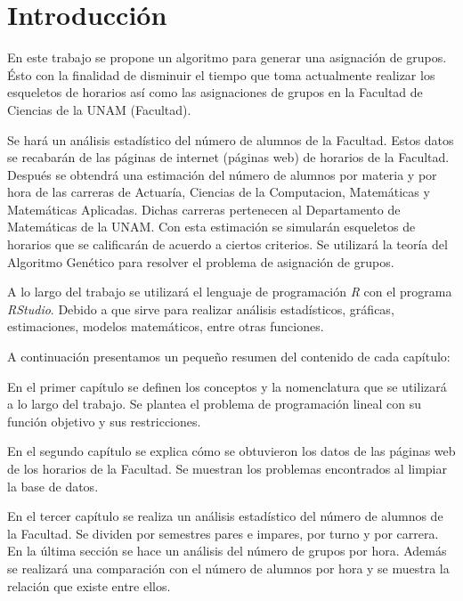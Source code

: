 \chapter*{Introducción}


En este trabajo se propone un algoritmo para generar una asignación de grupos. Ésto con la finalidad de disminuir el tiempo que toma actualmente realizar los esqueletos de horarios así como las asignaciones de grupos en la Facultad de Ciencias de la UNAM (Facultad). 

Se hará un análisis estadístico del número de alumnos de la Facultad. Estos datos se recabarán de las páginas de internet (páginas web) de horarios de la Facultad. Después se obtendrá una estimación del número de alumnos por materia y por hora de las carreras de Actuaría, Ciencias de la Computacion, Matemáticas y Matemáticas Aplicadas. Dichas carreras pertenecen al Departamento de Matemáticas de la UNAM. Con esta estimación se simularán esqueletos de horarios que se calificarán de acuerdo a ciertos criterios. Se utilizará la teoría del Algoritmo Genético para resolver el problema de asignación de grupos. 

A lo largo del trabajo se utilizará el lenguaje de programación \textit{R} con el programa \textit{RStudio}. Debido a que sirve para realizar análisis estadísticos, gráficas, estimaciones, modelos matemáticos, entre otras funciones.

A continuación presentamos un pequeño resumen del contenido de cada capítulo:

En el primer capítulo se definen los conceptos y la nomenclatura que se utilizará a lo largo del trabajo. Se plantea el problema de programación lineal con su función objetivo y sus restricciones.

En el segundo capítulo se explica cómo se obtuvieron los datos de las páginas web de los horarios de la Facultad. Se muestran los problemas encontrados al limpiar la base de datos.

En el tercer capítulo se realiza un análisis estadístico del número de alumnos de la Facultad. Se dividen por semestres pares e impares, por turno y por carrera. En la última sección se hace un análisis del número de grupos por hora. Además se realizará una comparación con el número de alumnos por hora y se muestra la relación que existe entre ellos.

